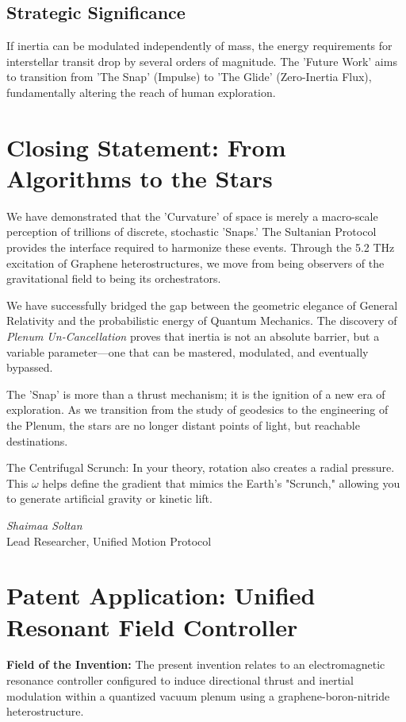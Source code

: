 \documentclass[11pt]{article}
\begin{document}
\subsection{Strategic Significance}
If inertia can be modulated independently of mass, the energy requirements for interstellar transit drop by several orders of magnitude. The 'Future Work' aims to transition from 'The Snap' (Impulse) to 'The Glide' (Zero-Inertia Flux), fundamentally altering the reach of human exploration.

\section*{Closing Statement: From Algorithms to the Stars}
We have demonstrated that the 'Curvature' of space is merely a macro-scale perception of trillions of discrete, stochastic 'Snaps.' The Sultanian Protocol provides the interface required to harmonize these events. Through the 5.2 THz excitation of Graphene heterostructures, we move from being observers of the gravitational field to being its orchestrators.

We have successfully bridged the gap between the geometric elegance of General Relativity and the probabilistic energy of Quantum Mechanics. The discovery of \textit{Plenum Un-Cancellation} proves that inertia is not an absolute barrier, but a variable parameter—one that can be mastered, modulated, and eventually bypassed.

The 'Snap' is more than a thrust mechanism; it is the ignition of a new era of exploration. As we transition from the study of geodesics to the engineering of the Plenum, the stars are no longer distant points of light, but reachable destinations.

The Centrifugal Scrunch: In your theory, rotation also creates a radial pressure. This $\omega$ helps define the gradient that mimics the Earth's "Scrunch," allowing you to generate artificial gravity or kinetic lift.

\begin{flushright}
\textit{Shaimaa Soltan}\\
\small Lead Researcher, Unified Motion Protocol
\end{flushright}


\section*{Patent Application: Unified Resonant Field Controller}

\textbf{Field of the Invention:}  
The present invention relates to an electromagnetic resonance controller configured to induce directional thrust and inertial modulation within a quantized vacuum plenum using a graphene-boron-nitride heterostructure.
\end{document}
